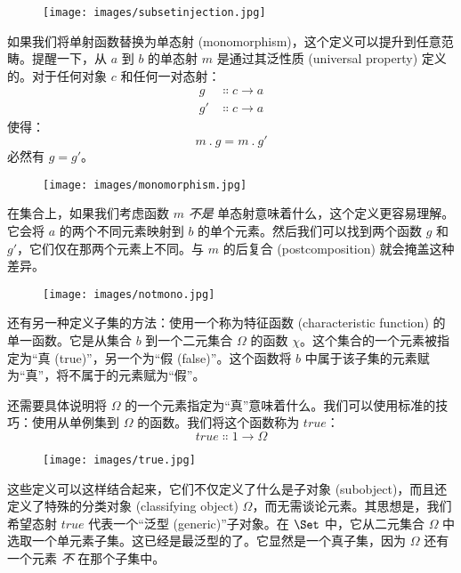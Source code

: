 \begin{figure}[H]
  \centering
  \texttt{[image: images/subsetinjection.jpg]}
\end{figure}

\noindent
如果我们将单射函数替换为单态射 (monomorphism)，这个定义可以提升到任意范畴。提醒一下，从 $a$ 到 $b$ 的单态射 $m$ 是通过其泛性质 (universal property) 定义的。对于任何对象 $c$ 和任何一对态射：
\begin{align*}
  g  & \Colon c \to a \\
  g' & \Colon c \to a
\end{align*}
使得：
\[m\ .\ g = m\ .\ g'\]
必然有 $g = g'$。

\begin{figure}[H]
  \centering
  \texttt{[image: images/monomorphism.jpg]}
\end{figure}

\noindent
在集合上，如果我们考虑函数 $m$ \emph{不是} 单态射意味着什么，这个定义更容易理解。它会将 $a$ 的两个不同元素映射到 $b$ 的单个元素。然后我们可以找到两个函数 $g$ 和 $g'$，它们仅在那两个元素上不同。与 $m$ 的后复合 (postcomposition) 就会掩盖这种差异。

\begin{figure}[H]
  \centering
  \texttt{[image: images/notmono.jpg]}
\end{figure}

\noindent
还有另一种定义子集的方法：使用一个称为特征函数 (characteristic function) 的单一函数。它是从集合 $b$ 到一个二元集合 $\Omega$ 的函数 $\chi$。这个集合的一个元素被指定为“真 (true)”，另一个为“假 (false)”。这个函数将 $b$ 中属于该子集的元素赋为“真”，将不属于的元素赋为“假”。

还需要具体说明将 $\Omega$ 的一个元素指定为“真”意味着什么。我们可以使用标准的技巧：使用从单例集到 $\Omega$ 的函数。我们将这个函数称为 $\mathit{true}$：
\[\mathit{true} \Colon 1 \to \Omega\]

\begin{figure}[H]
  \centering
  \texttt{[image: images/true.jpg]}
\end{figure}

\noindent
这些定义可以这样结合起来，它们不仅定义了什么是子对象 (subobject)，而且还定义了特殊的分类对象 (classifying object) $\Omega$，而无需谈论元素。其思想是，我们希望态射 $\mathit{true}$ 代表一个“泛型 (generic)”子对象。在 $\Set$ 中，它从二元集合 $\Omega$ 中选取一个单元素子集。这已经是最泛型的了。它显然是一个真子集，因为 $\Omega$ 还有一个元素 \emph{不} 在那个子集中。

